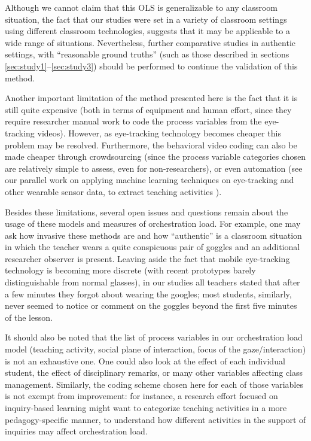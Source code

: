 \documentclass[10pt,journal,compsoc]{IEEEtran}
\begin{document}
Although we cannot claim that this OLS is generalizable to any classroom situation, the fact that our studies were set in a variety of classroom settings using different classroom technologies, suggests that it may be applicable to a wide range of situations. Nevertheless, further comparative studies in authentic settings, with ``reasonable ground truths'' (such as those described in sections \ref{sec:study1}--\ref{sec:study3}) should be performed to continue the validation of this method.

Another important limitation of the method presented here is the fact that it is still quite expensive (both in terms of equipment and human effort, since they require researcher manual work to code the process variables from the eye-tracking videos). However, as eye-tracking technology becomes cheaper %
this problem may be resolved. Furthermore, the behavioral video coding can also be made cheaper through crowdsourcing (since the process variable categories chosen are relatively simple to assess, even for non-researchers), or even automation (see our parallel work on applying machine learning techniques on eye-tracking and other wearable sensor data, to extract teaching activities \cite{prieto2016teaching}).

Besides these limitations, several open issues and questions remain about the usage of these models and measures of orchestration load. For example, one may ask how invasive these methods are and how ``authentic'' is a classroom situation in which the teacher wears a quite conspicuous pair of goggles and an additional researcher observer is present. Leaving aside the fact that mobile eye-tracking technology is becoming more discrete (with recent prototypes barely distinguishable from normal glasses), in our studies all teachers stated that after a few minutes they forgot about wearing the googles; most students, similarly, never seemed to notice or comment on the goggles beyond the first five minutes of the lesson.

It should also be noted that the list of process variables in our orchestration load model (teaching activity, social plane of interaction, focus of the gaze/interaction) is not an exhaustive one. One could also look at the effect of each individual student, the effect of disciplinary remarks, or many other variables affecting class management. Similarly, the coding scheme chosen here for each of those variables is not exempt from improvement: for instance, a research effort focused on inquiry-based learning might want to categorize teaching activities in a more pedagogy-specific manner, to understand how different activities in the support of inquiries may affect orchestration load.
\end{document}

